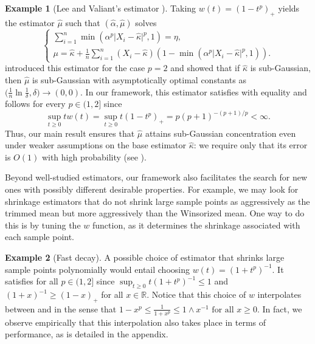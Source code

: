 \documentclass{article}
\theoremstyle{plain}
\theoremstyle{definition}
\newtheorem{example}{Example}
\def\R{\mathbb{R}} %
\begin{document}
\begin{example}[Lee and Valiant's estimator \cite{lee2022optimal}]\label{ex:rho_lv}
	Taking $w(t)=(1-t^p)_+$ yields the estimator $\widehat{\mu}$ such that $(\widehat{\alpha},\widehat{\mu})$ solves
	\[\begin{cases}
			\sum_{i=1}^n\min(\alpha^p\lvert X_i-\widehat{\kappa}\rvert^p,1)=\eta, \\
			\mu=\widehat{\kappa}+\frac{1}{n}\sum_{i=1}^n(X_i-\widehat{\kappa})(1-\min(\alpha^p\lvert X_i-\widehat{\kappa}\rvert^p,1)).
		\end{cases} \]
    \cite{lee2022optimal} introduced this estimator for the case $p=2$ and showed that if $\widehat{\kappa}$ is sub-Gaussian, then $\widehat{\mu}$ is sub-Gaussian with asymptotically optimal constants as $\big(\frac{1}{n}\ln\frac{1}{\delta}, \delta\big) \to (0,0)$. In our framework, this estimator satisfies  with equality and  follows for every $p \in (1, 2]$ since
    \[
      \sup_{t\geq0}tw(t)=\sup_{t\geq0}t(1-t^p)_+=p(p+1)^{-(p+1)/p}<\infty.
    \]
    Thus, our main result ensures that \( \widehat{\mu }  \) attains sub-Gaussian concentration even under weaker assumptions on the base estimator \( \widehat{\kappa}\): we require only that its error is \( O(1) \) with high probability (see ). 
\end{example}

Beyond well-studied estimators, our framework also facilitates the search for new ones with possibly different desirable properties. For example, we may look for shrinkage estimators that do not shrink large sample points as aggressively as the trimmed mean but more aggressively than the Winsorized mean. One way to do this is by tuning the $w$ function, as it determines the shrinkage associated with each sample point.

\begin{example}[Fast decay]\label{ex:rho_inv} A possible choice of estimator that shrinks large sample points polynomially would entail choosing $w(t)=(1+t^p)^{-1}$. It satisfies  for all $p\in(1,2]$ since $\sup_{t\geq0}t(1+t^p)^{-1}\le 1$ and \( (1+x)^{-1}\ge (1-x)_+ \) for all \( x \in \R \). Notice that this choice of \( w  \) interpolates between  and  in the sense that $1-x^p\le \frac{1}{1+x^p}\le 1\wedge x^{-1} \text{ for all } x\ge 0.$ In fact, we observe empirically that this interpolation also takes place in terms of performance, as is detailed in the appendix.
\end{example}
\end{document}
